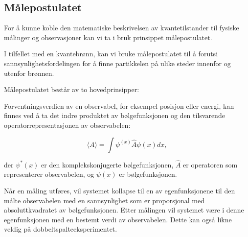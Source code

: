 \subsection*{Målepostulatet}

For å kunne koble den matematiske beskrivelsen av kvantetilstander til fysiske målinger og observasjoner kan vi ta i bruk prinsippet målepostulatet.

I tilfellet med en kvantebrønn, kan vi bruke målepostulatet til å forutsi sannsynlighetsfordelingen for å finne partikkelen på ulike steder innenfor og utenfor brønnen.

Målepostulatet består av to hovedprinsipper:

Forventningsverdien av en observabel, for eksempel posisjon eller energi, kan finnes ved å ta det indre produktet av bølgefunksjonen og den tilsvarende operatorrepresentasjonen av observabelen:

\begin{equation*}
    \langle A \rangle = \int \psi^{(x)} \hat{A} \psi(x) dx,
\end{equation*}

der $\psi^*(x)$ er den komplekskonjugerte bølgefunksjonen, $\hat{A}$ er operatoren som representerer observabelen, og $\psi(x)$ er bølgefunksjonen.

Når en måling utføres, vil systemet kollapse til en av egenfunksjonene til den målte observabelen med en sannsynlighet som er proporsjonal med absoluttkvadratet av bølgefunksjonen. Etter målingen vil systemet være i denne egenfunksjonen med en bestemt verdi av observabelen. Dette kan også likne veldig på dobbeltspalteeksperimentet.